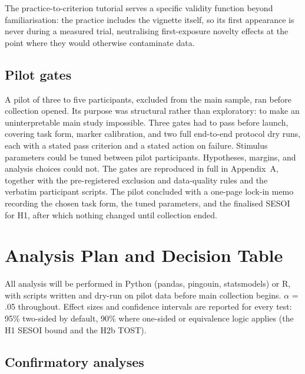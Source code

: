 The practice-to-criterion tutorial serves a specific validity function beyond familiarisation: the
practice includes the vignette itself, so its first appearance is never during a measured trial,
neutralising first-exposure novelty effects at the point where they would otherwise contaminate data.

\subsection{Pilot gates}

A pilot of three to five participants, excluded from the main sample, ran before collection opened.
Its purpose was structural rather than exploratory: to make an uninterpretable main study impossible.
Three gates had to pass before launch, covering task form, marker calibration, and two full
end-to-end protocol dry runs, each with a stated pass criterion and a stated action on failure.
Stimulus parameters could be tuned between pilot participants. Hypotheses, margins, and analysis
choices could not. The gates are reproduced in full in Appendix~A, together with the pre-registered
exclusion and data-quality rules and the verbatim participant scripts. The pilot concluded with a
one-page lock-in memo recording the chosen task form, the tuned parameters, and the finalised SESOI
for H1, after which nothing changed until collection ended.

\section{Analysis Plan and Decision Table}

All analysis will be performed in Python (pandas, pingouin, statsmodels) or R, with scripts written
and dry-run on pilot data before main collection begins. $\alpha$ = .05 throughout. Effect sizes and
confidence intervals are reported for every test: 95\% two-sided by default, 90\% where one-sided or
equivalence logic applies (the H1 SESOI bound and the H2b TOST).

\subsection{Confirmatory analyses}

